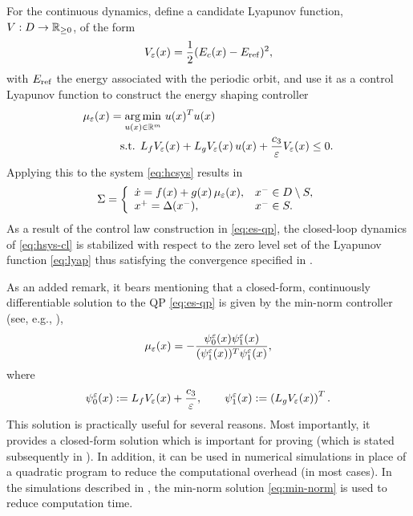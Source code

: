 For the continuous dynamics, define a candidate Lyapunov function, $V : D \to
\mathbb{R}_{\geq 0}$, of the form
% 
\begin{align}
  \label{eq:lyap}
  V_{\varepsilon}(x) = \frac{1}{2} (E_{c}(x) - E_{\mathrm{ref}})^2,
\end{align}
% 
with $E_{\mathrm{ref}}$ the energy associated with the periodic orbit, and use it as a
control Lyapunov function to construct the energy shaping controller
% 
\begin{align}
  \label{eq:es-qp}
  \mu_{\varepsilon}(x) = \operatorname*{arg\,min}_{u(x) \in \mathbb{R}^{m}} \ & u(x)^T u(x)\\
  \nonumber
  \mbox{s.t. } L_{f} V_{\varepsilon}&(x) + L_{g} V_{\varepsilon}(x) \, u(x) +
  \frac{c_{3}}{\varepsilon} V_{\varepsilon}(x) \leq 0.
\end{align}
% 
Applying this to the system \eqref{eq:hcsys} results in
% 
\begin{align}
  \label{eq:hsys-cl}
  \Sigma = \left\{
    \begin{array}{l l}
      {\dot {x}} = f(x) + g(x) \, \mu_{\varepsilon}(x), & x^{-} \in D \setminus S,\\
      x^{+} = \Delta(x^{-}), &x^{-} \in S.
    \end{array}\right.
\end{align}
% 
As a result of the control law construction in \eqref{eq:es-qp}, the closed-loop
dynamics of \eqref{eq:hsys-cl} is stabilized with respect to the zero level set
of the Lyapunov function \eqref{eq:lyap} thus satisfying the convergence
specified in .

As an added remark, it bears mentioning that a closed-form, continuously
differentiable solution to the QP \eqref{eq:es-qp} is given by the min-norm
controller (see, e.g., \cite{Freeman1996}),
\begin{align}
  \label{eq:min-norm}
  \mu_{\varepsilon}(x) = -\frac{\psi^{\varepsilon}_{0}(x) \psi^{\varepsilon}_{1}(x)}{(\psi^{\varepsilon}_{1}(x))^{T}
    \psi^{\varepsilon}_{1}(x)},
\end{align}
where
\begin{align*}
  \psi^{\varepsilon}_{0}(x) := L_{f} V_{\varepsilon}(x) + \frac{c_{3}}{\varepsilon}, \qquad
  \psi^{\varepsilon}_{1}(x) := \left( L_{g} V_{\varepsilon}(x) \right)^{T}.
\end{align*}
This solution is practically useful for several reasons.
% 
Most importantly, it provides a closed-form solution which is important for
proving  (which is stated subsequently in
).
% 
In addition, it can be used in numerical simulations in place of a quadratic
program to reduce the computational overhead (in most cases).
% 
In the simulations described in , the
min-norm solution \eqref{eq:min-norm} is used to reduce computation time.




